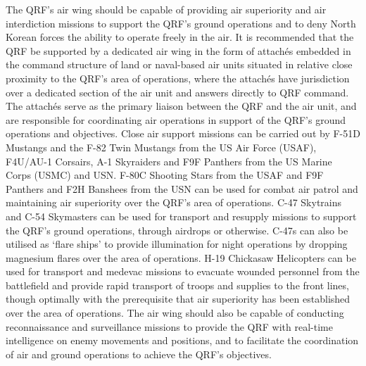 \documentclass[a4paper,12pt]{article}
\begin{document}
{	The QRF's air wing should be capable of providing air superiority and air interdiction missions to support the QRF's ground operations and to deny North Korean forces the ability to operate freely in the air. It is recommended that the QRF be supported by a dedicated air wing in the form of attachés embedded in the command structure of land or naval-based air units situated in relative close proximity to the QRF's area of operations, where the attachés have jurisdiction over a dedicated section of the air unit and answers directly to QRF command. The attachés serve as the primary liaison between the QRF and the air unit, and are responsible for coordinating air operations in support of the QRF's ground operations and objectives.	Close air support missions can be carried out by F-51D Mustangs and the F-82 Twin Mustangs from the US Air Force (USAF), F4U/AU-1 Corsairs, A-1 Skyraiders and F9F Panthers from the US Marine Corps (USMC) and USN. F-80C Shooting Stars from the USAF and F9F Panthers and F2H Banshees from the USN can be used for combat air patrol and maintaining air superiority over the QRF's area of operations. C-47 Skytrains and C-54 Skymasters can be used for transport and resupply missions to support the QRF's ground operations, through airdrops or otherwise. C-47s can also be utilised as `flare ships' to provide illumination for night operations by dropping magnesium flares over the area of operations. H-19 Chickasaw Helicopters can be used for transport and medevac missions to evacuate wounded personnel from the battlefield and provide rapid transport of troops and supplies to the front lines, though optimally with the prerequisite that air superiority has been established over the area of operations. The air wing should also be capable of conducting reconnaissance and surveillance missions to provide the QRF with real-time intelligence on enemy movements and positions, and to facilitate the coordination of air and ground operations to achieve the QRF's objectives.
}

\clearpage
\end{document}
